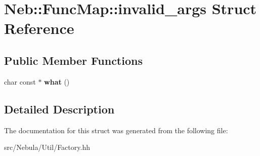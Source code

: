 \hypertarget{structNeb_1_1FuncMap_1_1invalid__args}{\section{\-Neb\-:\-:\-Func\-Map\-:\-:invalid\-\_\-args \-Struct \-Reference}
\label{structNeb_1_1FuncMap_1_1invalid__args}
}
\subsection*{\-Public \-Member \-Functions}
\begin{DoxyCompactItemize}
\item 
\hypertarget{structNeb_1_1FuncMap_1_1invalid__args_aac659f17828f0055c5a95701ee85cb2a}{char const $\ast$ {\bfseries what} ()}\label{structNeb_1_1FuncMap_1_1invalid__args_aac659f17828f0055c5a95701ee85cb2a}

\end{DoxyCompactItemize}


\subsection{\-Detailed \-Description}


\-The documentation for this struct was generated from the following file\-:\begin{DoxyCompactItemize}
\item 
src/\-Nebula/\-Util/\-Factory.\-hh\end{DoxyCompactItemize}
